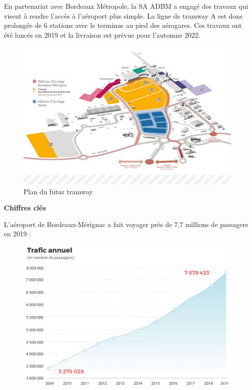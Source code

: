 En partenariat avec Bordeaux Métropole, la SA ADBM a engagé des travaux qui visent à rendre l'accès à l'aéroport plus simple. La ligne de tramway A est donc prolongée de 6 stations avec le terminus au pied des aérogares. Ces travaux ont été lancés en 2019 et la livraison est prévue pour l'automne 2022.\newline

\begin{figure}[hbt!]
    \centering
    \includegraphics[width=16cm]{Images/tramway.jpg}
    \caption{Plan du futur tramway}
    \label{fig:futurtram}
\end{figure}

\newpage

\textbf{Chiffres clés}\newline

L'aéroport de Bordeaux-Mérignac a fait voyager près de 7,7 millions de passagers en 2019 :

\begin{figure}[hbt!]
    \centering
    \includegraphics[width=12cm]{Images/trafic.jpg}
    \label{fig:trafic}
\end{figure}

